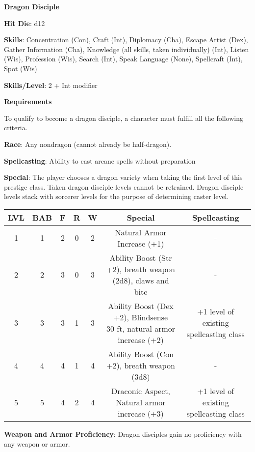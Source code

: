 \textbf{\huge{Dragon Disciple}}

\textbf{Hit Die}: d12

\textbf{Skills}: Concentration (Con), Craft (Int), Diplomacy (Cha), Escape Artist (Dex), Gather Information (Cha), Knowledge (all skills, taken individually) (Int), Listen (Wis), Profession (Wis), Search (Int), Speak Language (None), Spellcraft (Int), Spot (Wis)

\textbf{Skills/Level}: 2 + Int modifier

\textbf{\large{Requirements}}

To qualify to become a dragon disciple, a character must fulfill all the following criteria.

\textbf{Race}: Any nondragon (cannot already be half-dragon).

\textbf{Spellcasting}: Ability to cast arcane spells without preparation

\textbf{Special}: The player chooses a dragon variety when taking the first level of this prestige class. Taken dragon disciple levels cannot be retrained. Dragon disciple levels stack with sorcerer levels for the purpose of determining caster level.

\begin{center}
\begin{adjustwidth}{-4cm}{}
\begin{small}
\begin{tabular}{| c | c | c | c | c | c | c |}
\hline
LVL &BAB &F &R &W &Special &Spellcasting \\
\hline
1 &1 &2 &0 &2 &Natural Armor Increase (+1) &- \\
2 &2 &3 &0 &3 &Ability Boost (Str +2), breath weapon (2d8), claws and bite &- \\
3 &3 &3 &1 &3 &\makecell{Ability Boost (Dex +2), Blindsense\\ 30 ft, natural armor increase (+2)} &+1 level of existing spellcasting class \\
4 &4 &4 &1 &4 &Ability Boost (Con +2), breath weapon (3d8) &- \\
5 &5 &4 &2 &4 &Draconic Aspect, Natural armor increase (+3) &+1 level of existing spellcasting class \\
\hline
\end{tabular}
\end{small}
\end{adjustwidth}
\end{center}

\textbf{Weapon and Armor Proficiency}: Dragon disciples gain no proficiency with any weapon or armor.


